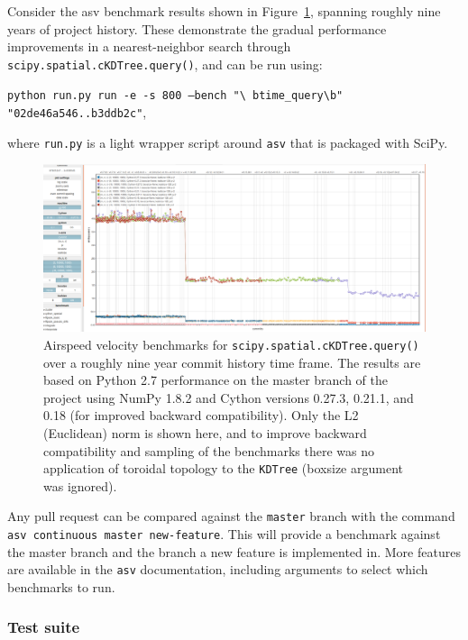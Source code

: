 \documentclass[fleqn,10pt]{wlscirep}
\begin{document}
Consider the asv benchmark results shown in Figure~\ref{fig:asvbench}, spanning
roughly nine years of project history. These demonstrate the gradual
performance improvements in a nearest-neighbor search through
\texttt{scipy.spatial.cKDTree.query()}, and can be run using:

\texttt{python run.py run -e -s 800 --bench "\textbackslash
btime\_query\textbackslash b" "02de46a546..b3ddb2c"},

where \texttt{run.py} is a light wrapper script around \texttt{asv}
that is packaged with SciPy.

\begin{figure}[H]
\centering
\includegraphics[width=\textwidth]{static/asv_time_query_ckdtree}
\caption{Airspeed velocity benchmarks for \texttt{scipy.spatial.cKDTree.query()}
over a roughly nine year commit history time frame. The results are based on
Python 2.7 performance on the master branch of the project using NumPy 1.8.2
and Cython versions 0.27.3, 0.21.1, and 0.18 (for improved backward
compatibility). Only the L2 (Euclidean) norm is shown here, and to improve
backward compatibility and sampling of the benchmarks there was no application
of toroidal topology to the \texttt{KDTree} (boxsize argument was ignored).}
\label{fig:asvbench}
\end{figure}

Any pull request can be compared against the \texttt{master} branch with the
command \texttt{asv continuous master new-feature}. This will provide a
benchmark against the master branch and the branch a new feature is implemented
in. More features are available in the \texttt{asv} documentation\cite{asvdocs}, including 
arguments to select which benchmarks to run.

\subsubsection*{Test suite}
\end{document}
